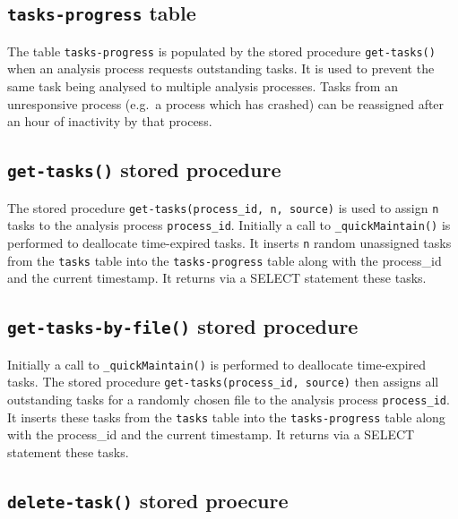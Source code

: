 \documentclass[
]{book}
\begin{document}
\hypertarget{tasks-progress-table}{%
\subsection{\texorpdfstring{\texttt{tasks-progress} table}{tasks-progress table}}\label{tasks-progress-table}}

The table \texttt{tasks-progress} is populated by the stored procedure \texttt{get-tasks()} when an analysis process requests outstanding tasks. It is used to prevent the same task being analysed to multiple analysis processes. Tasks from an unresponsive process (e.g.~a process which has crashed) can be reassigned after an hour of inactivity by that process.

\hypertarget{get-tasks-stored-procedure}{%
\subsection{\texorpdfstring{\texttt{get-tasks()} stored procedure}{get-tasks() stored procedure}}\label{get-tasks-stored-procedure}}

The stored procedure \texttt{get-tasks(process\_id,\ n,\ source)} is used to assign \texttt{n} tasks to the analysis process \texttt{process\_id}. Initially a call to \texttt{\_quickMaintain()} is performed to deallocate time-expired tasks. It inserts \texttt{n} random unassigned tasks from the \texttt{tasks} table into the \texttt{tasks-progress} table along with the process\_id and the current timestamp. It returns via a SELECT statement these tasks.

\hypertarget{get-tasks-by-file-stored-procedure}{%
\subsection{\texorpdfstring{\texttt{get-tasks-by-file()} stored procedure}{get-tasks-by-file() stored procedure}}\label{get-tasks-by-file-stored-procedure}}

Initially a call to \texttt{\_quickMaintain()} is performed to deallocate time-expired tasks. The stored procedure \texttt{get-tasks(process\_id,\ source)} then assigns all outstanding tasks for a randomly chosen file to the analysis process \texttt{process\_id}. It inserts these tasks from the \texttt{tasks} table into the \texttt{tasks-progress} table along with the process\_id and the current timestamp. It returns via a SELECT statement these tasks.

\hypertarget{delete-task-stored-proecure}{%
\subsection{\texorpdfstring{\texttt{delete-task()} stored proecure}{delete-task() stored proecure}}\label{delete-task-stored-proecure}}
\end{document}
